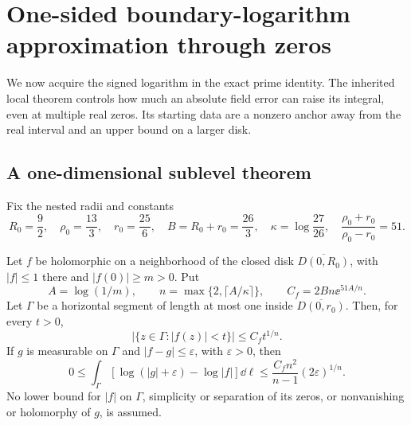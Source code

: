 \section{One-sided boundary-logarithm approximation through zeros}\label{sec:boundary-log}

We now acquire the signed logarithm in the exact prime identity.
The inherited local theorem \cite{OGBoundaryLog,OGAssemblyAssessment}
controls how much an absolute field error can raise its integral, even at
multiple real zeros. Its starting data are a nonzero anchor away
from the real interval and an upper bound on a larger disk.

\subsection{A one-dimensional sublevel theorem}

Fix the nested radii and constants
\begin{equation}\label{eq:disk-constants}
 R_0=\frac92,\quad \rho_0=\frac{13}3,\quad r_0=\frac{25}6,\quad
 B=R_0+r_0=\frac{26}3,\quad
 \kappa=\log\frac{27}{26},\quad
 \frac{\rho_0+r_0}{\rho_0-r_0}=51 .
\end{equation}

\begin{theorem}\label{thm:local-log}
Let \(f\) be holomorphic on a neighborhood of the closed disk
\(\overline{D(0,R_0)}\), with \(|f|\le1\) there and
\(|f(0)|\ge m>0\). Put
\begin{equation}\label{eq:n-C}
 A=\log(1/m),\qquad
 n=\max\{2,\lceil A/\kappa\rceil\},\qquad
 C_f=2Bn\ee^{51A/n}.
\end{equation}
Let \(\Gamma\) be a horizontal segment of length at most one inside
\(\overline{D(0,r_0)}\). Then, for every \(t>0\),
\begin{equation}\label{eq:sublevel}
 |\{z\in\Gamma:|f(z)|<t\}|\le C_ft^{1/n}.
\end{equation}
If \(g\) is measurable on \(\Gamma\) and
\(|f-g|\le\varepsilon\), with \(\varepsilon>0\), then
\begin{equation}\label{eq:local-envelope}
 0\le\int_\Gamma
       [\log(|g|+\varepsilon)-\log|f|]\dd\ell
 \le\frac{C_fn^2}{n-1}(2\varepsilon)^{1/n}.
\end{equation}
No lower bound for \(|f|\) on \(\Gamma\), simplicity or separation
of its zeros, or nonvanishing or holomorphy of \(g\), is assumed.
\end{theorem}

